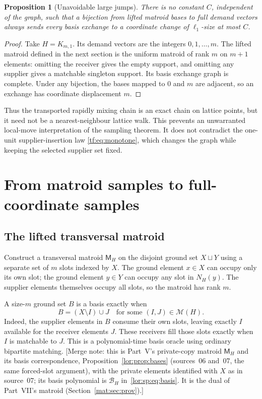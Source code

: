 \documentclass[11pt]{article}
\numberwithin{equation}{section}
\newtheorem{proposition}[theorem]{Proposition}
\theoremstyle{definition}
\newcommand{\PM}{\mathcal M}
\newcommand{\cB}{\mathcal B}
\begin{document}
\begin{proposition}[Unavoidable large jumps]
\label{tf:prop:jumps}
There is no constant $C$, independent of the graph, such that a bijection
from lifted matroid bases to full demand vectors always sends every basis
exchange to a coordinate change of $\ell_1$-size at most $C$.
\end{proposition}
\begin{proof}
Take $H=K_{m,1}$. Its demand vectors are the integers $0,1,\ldots,m$.
The lifted matroid defined in the next section is the uniform matroid of
rank $m$ on $m+1$ elements: omitting the receiver gives the empty support,
and omitting any supplier gives a matchable singleton support. Its basis
exchange graph is complete. Under any bijection, the bases mapped to $0$
and $m$ are adjacent, so an exchange has coordinate displacement $m$.
\end{proof}

Thus the transported rapidly mixing chain is an exact chain on lattice
points, but it need not be a nearest-neighbour lattice walk. This prevents
an unwarranted local-move interpretation of the sampling theorem. It does
not contradict the one-unit supplier-insertion law
\eqref{tf:eq:monotone}, which changes the graph while keeping the selected
supplier set fixed.

\section{From matroid samples to full-coordinate samples}
\label{tf:sec:sampling}

\subsection{The lifted transversal matroid}
Construct a transversal matroid $\mathsf M_H$ on the disjoint ground set
$X\sqcup Y$ using a separate set of $m$ slots indexed by $X$. The ground
element $x\in X$ can occupy only its own slot; the ground element $y\in Y$
can occupy any slot in $N_H(y)$. The supplier elements themselves occupy
all slots, so the matroid has rank $m$.

A size-$m$ ground set $B$ is a basis exactly when
\begin{equation}
 B=(X\setminus I)\cup J\quad\text{for some }(I,J)\in\PM(H).
 \label{tf:eq:lift}
\end{equation}
Indeed, the supplier elements in $B$ consume their own slots, leaving
exactly $I$ available for the receiver elements $J$. These receivers fill
those slots exactly when $I$ is matchable to $J$. This is a polynomial-time
basis oracle using ordinary bipartite matching.
[Merge note: this is Part~V's private-copy matroid $\mathsf M_H$ and its
basis correspondence, Proposition~\ref{lor:prop:bases} (sources~06
and~07, the same forced-slot argument), with the private elements
identified with $X$ as in source~07; its basis polynomial is
$\cB_H$ in~\eqref{lor:sp:eq:basis}. It is the dual of Part~VII's matroid
(Section~\ref{mat:sec:prov}).]
\end{document}
